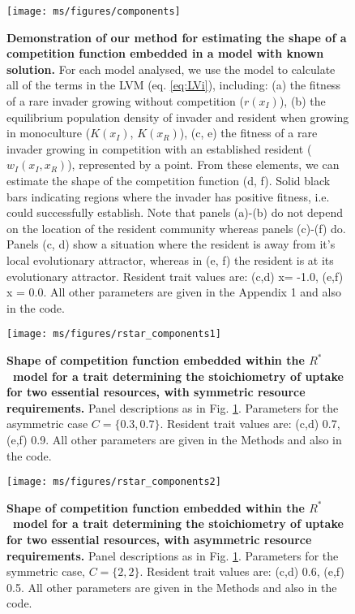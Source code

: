 \documentclass[a4paper,11pt]{article}
\newcommand{\Rstar}{\ensuremath{R^*}}
\begin{document}
\clearpage

\begin{figure}[ht]
 \centering
 \texttt{[image: ms/figures/components]}
 \caption{{\bf Demonstration of our method for estimating the shape of a competition function embedded in a model with known solution.} For each model analysed, we use the model to calculate all of the terms in the LVM (eq. \ref{eq:LVi}), including: (a) the fitness of a rare invader growing without competition ($r(x_I)$), (b) the equilibrium population density of invader and resident when growing in monoculture ($K(x_I)$, $K(x_R)$), (c, e) the fitness of a rare invader growing in competition with an established resident ($w_I(x_I, x_R)$), represented by a point. From these elements, we can estimate the shape of the competition function (d, f). Solid black bars indicating regions where the invader has positive fitness, i.e. could successfully establish. Note that panels (a)-(b) do not depend on the location of the resident community whereas panels (c)-(f) do. Panels (c, d) show a situation where the resident is away from it's local evolutionary attractor, whereas in (e, f) the resident is at its evolutionary attractor. Resident trait values are: (c,d) x= -1.0, (e,f) x = 0.0. All other parameters are given in the Appendix 1 and also in the code.}
\label{fig:components}
\end{figure}

\clearpage

\begin{figure}[ht]
  \centering
	\texttt{[image: ms/figures/rstar\_components1]}
  \caption{{\bf Shape of competition function embedded within the \Rstar\ model for a trait determining the stoichiometry of uptake for two essential resources, with symmetric resource requirements.} Panel descriptions as in Fig. \ref{fig:components}. Parameters for the asymmetric case $C = \{0.3, 0.7\}$. Resident trait values are: (c,d) 0.7, (e,f) 0.9. All other parameters are given in the Methods and also in the code.}
  \label{fig:Rstar}
\end{figure}

\clearpage

\begin{figure}[ht]
 \centering
 \texttt{[image: ms/figures/rstar\_components2]}
 \caption{{\bf Shape of competition function embedded within the \Rstar\ model for a trait determining the stoichiometry of uptake for two essential resources, with asymmetric resource requirements.} Panel descriptions as in Fig. \ref{fig:components}. Parameters for the symmetric case, $C = \{2, 2\}$.   Resident trait values are: (c,d) 0.6, (e,f) 0.5. All other parameters are given in the Methods and also in the code.} 
  \label{fig:rstar_components2}
\end{figure}
\end{document}
